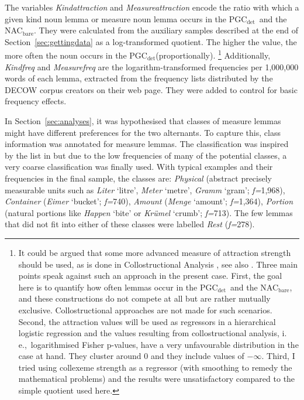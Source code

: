 \documentclass[USenglish]{article}
\newcommand{\ie}{i.\,e.,}
\newcommand{\Sub}[1]{\ensuremath{\mathrm{_{#1}}}}
\newcommand{\NACb}{NAC\Sub{bare}}
\newcommand{\PGCd}{PGC\Sub{det}}
\begin{document}
The variables \textit{Kindattraction} and \textit{Measureattraction} encode the ratio with which a given kind noun lemma or measure noun lemma occurs in the \PGCd\ and the  \NACb.
They were calculated from the auxiliary samples described at the end of Section~\ref{sec:gettingdata} as a log-transformed quotient.
The higher the value, the more often the noun occurs in the \PGCd (proportionally).%
\footnote{
  It could be argued that some more advanced measure of attraction strength should be used, as is done in Collostructional Analysis \citep{StefanowitschGries2003,GriesStefanowitsch2004}, see also \cite{Gries2015a}.
  Three main points speak against such an approach in the present case.
  First, the goal here is to quantify how often lemmas occur in the \PGCd\ and the \NACb, and these constructions do not compete at all but are rather mutually exclusive.
  Collostructional approaches are not made for such scenarios.
  Second, the attraction values will be used as regressors in a hierarchical logistic regression and the values resulting from collostructional analysis, \ie\ logarithmised Fisher p-values, have a very unfavourable distribution in the case at hand.
  They cluster around 0 and they include values of $-\infty$.
  Third, I tried using collexeme strength as a regressor (with smoothing to remedy the mathematical problems) and the results were unsatisfactory compared to the simple quotient used here.
}
Additionally, \textit{Kindfreq} and \textit{Measurefreq} are the logarithm-transformed frequencies per 1,000,000 words of each lemma, extracted from the frequency lists distributed by the DECOW corpus creators on their web page.
They were added to control for basic frequency effects.

In Section~\ref{sec:analyses}, it was hypothesised that classes of measure lemmas might have different preferences for the two alternants.
To capture this, class information was annotated for measure lemmas.
The classification was inspired by the list in \citet[530]{Koptjevskaja2001} but due to the low frequencies of many of the potential classes, a very coarse classification was finally used.
With typical examples and their frequencies in the final sample, the classes are:
\textit{Physical} (abstract precisely measurable units such as \textit{Liter} `litre', \textit{Meter} `metre', \textit{Gramm} `gram'; \textit{f=}1,968),
\textit{Container} (\textit{Eimer} `bucket'; \textit{f=}740),
\textit{Amount} (\textit{Menge} `amount'; \textit{f=}1,364), 
\textit{Portion} (natural portions like \textit{Happen} `bite' or \textit{Krümel} `crumb'; \textit{f=}713).
The few lemmas that did not fit into either of these classes were labelled \textit{Rest} (\textit{f=}278).
\end{document}
